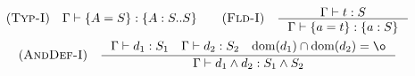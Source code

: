 \[\begin{array}{c}
    \RULE{Typ-I} \quad \TJT{\Gamma}{\DEF{A}{S}}{\TDEC{A}{S}{S}} \qquad

    \RULE{Fld-I} \quad \inference{
        \TJT{\Gamma}{t}{S}
    }{
        \TJT{\Gamma}{\DEF{a}{t}}{\FDEC{a}{S}}
    } \\[4mm]

    \RULE{AndDef-I} \quad \inference{
        \TJT{\Gamma}{d_1}{S_1} \quad
        \TJT{\Gamma}{d_2}{S_2} \quad
        \DOM{d_1} \cap \DOM{d_2} = \o
    }{
        \TJT{\Gamma}{\AGG{d_1}{d_2}}{\AGG{S_1}{S_2}}
    }
\end{array}\]
